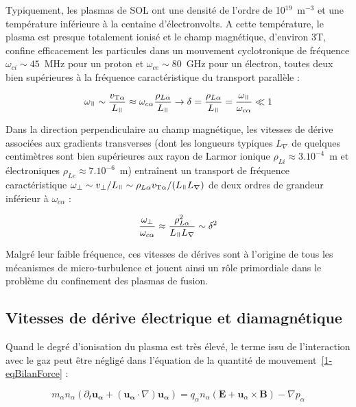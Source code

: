 \begin{refsection}
Typiquement, les plasmas de SOL ont une densité de
l'ordre de 10$^{19}$~m$^{-3}$ et une température inférieure à la centaine
d'électronvolts. A cette température, le plasma est presque totalement ionisé et
le champ magnétique, d'environ 3T, confine efficacement les particules dans un
mouvement cyclotronique de fréquence $\omega_{ci}\sim45$~MHz pour un proton et
$\omega_{ce}\sim80$~GHz pour un électron, toutes deux bien supérieures à la
fréquence caractéristique du transport parallèle :

\begin{equation}
\omega_\para\sim
\frac{v_{\text{T}\alpha}}{L_\para}\approx\omega_{c\alpha}\frac{\rho_{L\alpha}}{L_\para}\rightarrow
\delta=\frac{\rho_{L\alpha}}{L_\para}=\frac{\omega_\para}{\omega_{c\alpha}}\ll1
\end{equation} 

Dans la direction perpendiculaire au champ
magnétique, les vitesses de dérive associées aux gradients transverses (dont les longueurs
typiques $L_\nabla$ de quelques centimètres sont bien supérieures aux rayon de
Larmor ionique $\rho_{Li}\approx3.10^{-4}$~m et électroniques
$\rho_{Le}\approx7.10^{-6}$~m) entraînent un transport de fréquence
caractéristique $\omega_\perp\sim v_\perp/L_\para\sim\rho_{L\alpha}
v_{\text{T}\alpha}/(L_\para L_\nabla)$ de deux ordres de grandeur inférieur à
$\omega_{c\alpha}$ :

\begin{equation}
\frac{\omega_\perp}{\omega_{c\alpha}}\approx\frac{\rho_{L\alpha}^2}{L_\para
L_\nabla}\sim\delta^2
\end{equation}

Malgré leur faible fréquence, ces vitesses de dérives sont à l'origine de tous
les mécanismes de micro-turbulence et jouent ainsi un rôle primordiale dans le
problème du confinement des plasmas de fusion.

\subsection{Vitesses de dérive électrique et diamagnétique}

Quand le degré d'ionisation du plasma est très élevé, le terme issu de
l'interaction avec le gaz peut être négligé dans l'équation de la quantité de
mouvement~\eqref{1-eqBilanForce} :

\begin{equation}
\label{1-eqSOL}
 m_\alpha n_\alpha\left(\partial_t \mathbf{u_\alpha} +
(\mathbf{u_\alpha}\cdot\nabla)\mathbf{u_\alpha}\right)
={q_\alpha n_\alpha}\left(\mathbf E+\mathbf
u_\alpha\times \mathbf B\right)
-{\nabla p_\alpha}
\end{equation}


\end{refsection}
